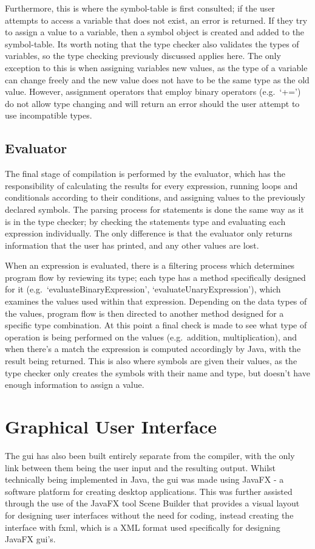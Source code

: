 \documentclass[
]{report}
\begin{document}
Furthermore, this is where the \gls{symbol-table} is first consulted; if the
user attempts to access a variable that does not exist, an error is
returned. If they try to assign a value to a variable, then a \gls{symbol}
object is created and added to the \gls{symbol-table}. Its worth noting that
the type checker also validates the types of variables, so the type
checking previously discussed applies here. The only exception to this
is when assigning variables new values, as the type of a variable can
change freely and the new value does not have to be the same type as the
old value. However, assignment operators that employ binary operators
(e.g.~`+=') do not allow type changing and will return an error should
the user attempt to use incompatible types.

\subsection{Evaluator}
The final stage of compilation is performed by the evaluator, which has
the responsibility of calculating the results for every \gls{expression},
running loops and conditionals according to their conditions, and
assigning values to the previously declared \glspl{symbol}. The \gls{parsing} process
for \glspl{statement} is done the same way as it is in the type checker; by
checking the \glspl{statement} type and evaluating each \gls{expression}
individually. The only difference is that the evaluator only returns
information that the user has printed, and any other values are lost.

When an \gls{expression} is evaluated, there is a filtering process which
determines program flow by reviewing its type; each type has
a method specifically designed for it (e.g.~`evaluateBinaryExpression',
`evaluateUnaryExpression'), which examines the values used within that
\gls{expression}. Depending on the data types of the values, program flow is
then directed to another method designed for a specific type
combination. At this point a final check is made to see what type of
operation is being performed on the values (e.g.~addition,
multiplication), and when there's a match the \gls{expression} is computed
accordingly by Java, with the result being returned. This is also where
\glspl{symbol} are given their values, as the type checker only creates the
\glspl{symbol} with their name and type, but doesn't have enough information to
assign a value.

\section{Graphical User Interface}
The \acrshort{gui} has also been built entirely separate from the compiler, with
the only link between them being the user input and the resulting
output. Whilst technically being implemented in Java, the \acrshort{gui} was made
using JavaFX - a software platform for creating desktop applications.
This was further assisted through the use of the JavaFX tool Scene
Builder that provides a visual layout for designing user interfaces
without the need for coding, instead creating the interface with \acrshort{fxml},
which is a XML format used specifically for designing JavaFX \acrshort{gui}'s.
\end{document}
